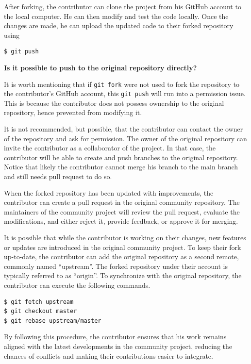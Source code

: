 After forking, the contributor can clone the project from his GitHub account to the local computer. He can then modify and test the code locally. Once the changes are made, he can upload the updated code to their forked repository using
\begin{lstlisting}
$ git push
\end{lstlisting}

\begin{mdframed}
\textbf{Is it possible to push to the original repository directly?}

It is worth mentioning that if \verb|git fork| were not used to fork the repository to the contributor's GitHub account, this \verb|git push| will run into a permission issue. This is because the contributor does not possess ownership to the original repository, hence prevented from modifying it.

It is not recommended, but possible, that the contributor can contact the owner of the repository and ask for permission. The owner of the original repository can invite the contributor as a collaborator of the project. In that case, the contributor will be able to create and push branches to the original repository. Notice that likely the contributor cannot merge his branch to the main branch and still needs pull request to do so.

\end{mdframed}

When the forked repository has been updated with improvements, the contributor can create a pull request in the original community repository. The maintainers of the community project will review the pull request, evaluate the modifications, and either reject it, provide feedback, or approve it for merging.

It is possible that while the contributor is working on their changes, new features or updates are introduced in the original community project. To keep their fork up-to-date, the contributor can add the original repository as a second remote, commonly named ``upstream''. The forked repository under their account is typically referred to as ``origin''. To synchronize with the original repository, the contributor can execute the following commands.
\begin{lstlisting}
$ git fetch upstream
$ git checkout master
$ git rebase upstream/master
\end{lstlisting}

By following this procedure, the contributor ensures that his work remains aligned with the latest developments in the community project, reducing the chances of conflicts and making their contributions easier to integrate.

